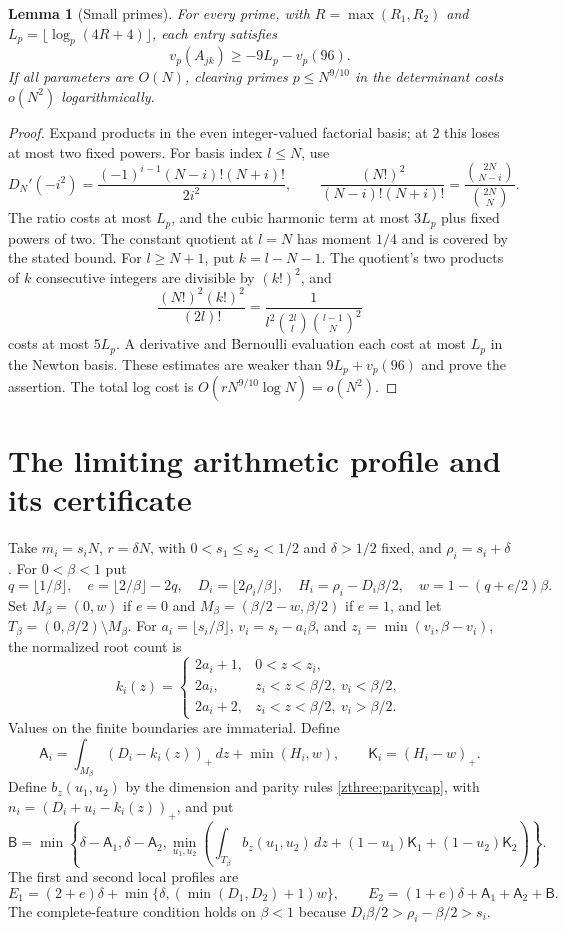 \documentclass[11pt]{article}
\newtheorem{lemma}[theorem]{Lemma}
\theoremstyle{definition}\newtheorem{definition}[theorem]{Definition}
\theoremstyle{remark}\newtheorem{remark}[theorem]{Remark}
\begin{document}
\begin{lemma}[Small primes]\label{zthree:small}
For every prime, with $R=\max(R_1,R_2)$ and
$L_p=\lfloor\log_p(4R+4)\rfloor$, each entry satisfies
\[
 v_p(A_{jk})\ge-9L_p-v_p(96).
\]
If all parameters are $O(N)$, clearing primes $p\le N^{9/10}$
in the determinant costs $o(N^2)$ logarithmically.
\end{lemma}
\begin{proof}
Expand products in the even integer-valued factorial basis; at $2$
this loses at most two fixed powers. For basis index $l\le N$, use
\[
 D_N'(-i^2)=\frac{(-1)^{i-1}(N-i)!(N+i)!}{2i^2},\qquad
 \frac{(N!)^2}{(N-i)!(N+i)!}
   =\frac{\binom{2N}{N-i}}{\binom{2N}{N}}.
\]
The ratio costs at most $L_p$, and the cubic harmonic term at most
$3L_p$ plus fixed powers of two. The constant quotient at $l=N$
has moment $1/4$ and is covered by the stated bound.
For $l\ge N+1$, put $k=l-N-1$. The quotient's two products of
$k$ consecutive integers are divisible by $(k!)^2$, and
\[
 \frac{(N!)^2(k!)^2}{(2l)!}
   =\frac1{l^2\binom{2l}{l}\binom{l-1}{N}^2}
\]
costs at most $5L_p$. A derivative and Bernoulli evaluation each
cost at most $L_p$ in the Newton basis. These estimates are weaker
than $9L_p+v_p(96)$ and prove the assertion. The total log cost is
$O(rN^{9/10}\log N)=o(N^2)$.
\end{proof}

\section{The limiting arithmetic profile and its certificate}
\label{zthree:profile}

Take $m_i=s_iN$, $r=\delta N$, with
$0<s_1\le s_2<1/2$ and $\delta>1/2$ fixed, and
$\rho_i=s_i+\delta$. For $0<\beta<1$ put
\[
 q=\lfloor1/\beta\rfloor,\quad
 e=\lfloor2/\beta\rfloor-2q,\quad D_i=\lfloor2\rho_i/\beta\rfloor,
 \quad H_i=\rho_i-D_i\beta/2,\quad w=1-(q+e/2)\beta.
\]
Set $M_\beta=(0,w)$ if $e=0$ and
$M_\beta=(\beta/2-w,\beta/2)$ if $e=1$, and let
$T_\beta=(0,\beta/2)\setminus M_\beta$.
For $a_i=\lfloor s_i/\beta\rfloor$, $v_i=s_i-a_i\beta$, and
$z_i=\min(v_i,\beta-v_i)$, the normalized root count is
\[
 k_i(z)=\begin{cases}
 2a_i+1,&0<z<z_i,\\
 2a_i,&z_i<z<\beta/2,\ v_i<\beta/2,\\
 2a_i+2,&z_i<z<\beta/2,\ v_i>\beta/2.
 \end{cases}
\]
Values on the finite boundaries are immaterial. Define
\[
 \mathsf A_i=\int_{M_\beta}(D_i-k_i(z))_+\,dz+\min(H_i,w),
 \qquad \mathsf K_i=(H_i-w)_+.
\]
Define $b_z(u_1,u_2)$ by the dimension and parity rules
\eqref{zthree:paritycap}, with $n_i=(D_i+u_i-k_i(z))_+$, and put
\[
 \mathsf B=\min\left\{\delta-\mathsf A_1,\delta-\mathsf A_2,
 \min_{u_1,u_2}\left(\int_{T_\beta}b_z(u_1,u_2)\,dz
 +(1-u_1)\mathsf K_1+(1-u_2)\mathsf K_2\right)\right\}.
\]
The first and second local profiles are
\[
 E_1=(2+e)\delta+\min\{\delta,(\min(D_1,D_2)+1)w\},\qquad
 E_2=(1+e)\delta+\mathsf A_1+\mathsf A_2+\mathsf B.
\]
The complete-feature condition holds on $\beta<1$ because
$D_i\beta/2>\rho_i-\beta/2>s_i$.
\end{document}
